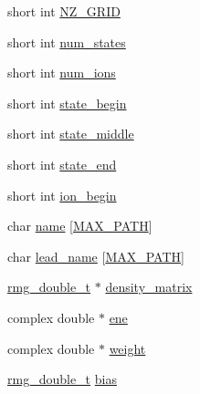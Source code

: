 \begin{DoxyCompactItemize}
\item 
short int \hyperlink{struct_n_o_n___l_i_n_e_a_r___t_h_r_e_e___p_a_r_t_ab39cd3e62908b7bd4a962698452023bd}{N\-Z\-\_\-\-G\-R\-I\-D}
\item 
short int \hyperlink{struct_n_o_n___l_i_n_e_a_r___t_h_r_e_e___p_a_r_t_ab4e8aa04c3f32725fd43c345cae9033b}{num\-\_\-states}
\item 
short int \hyperlink{struct_n_o_n___l_i_n_e_a_r___t_h_r_e_e___p_a_r_t_a90e5e3c0a22e9732f47346ca73d660ba}{num\-\_\-ions}
\item 
short int \hyperlink{struct_n_o_n___l_i_n_e_a_r___t_h_r_e_e___p_a_r_t_a6937a1fa2ad0ad9f66f9365e8825abb1}{state\-\_\-begin}
\item 
short int \hyperlink{struct_n_o_n___l_i_n_e_a_r___t_h_r_e_e___p_a_r_t_af1371e0d06b46f7180e7251fda0e8f25}{state\-\_\-middle}
\item 
short int \hyperlink{struct_n_o_n___l_i_n_e_a_r___t_h_r_e_e___p_a_r_t_aa173900ce7f6aa241d077c97d172a5d9}{state\-\_\-end}
\item 
short int \hyperlink{struct_n_o_n___l_i_n_e_a_r___t_h_r_e_e___p_a_r_t_a9ec3ec36805e886e3b7a410d94c72f0c}{ion\-\_\-begin}
\item 
char \hyperlink{struct_n_o_n___l_i_n_e_a_r___t_h_r_e_e___p_a_r_t_a6f60fba2e13c3a990798849ca4144013}{name} \mbox{[}\hyperlink{_t_d_d_f_t_2_headers_2params_8h_ab99ded389af74001a6298fc9e44e74e5}{M\-A\-X\-\_\-\-P\-A\-T\-H}\mbox{]}
\item 
char \hyperlink{struct_n_o_n___l_i_n_e_a_r___t_h_r_e_e___p_a_r_t_ae14b2607b564fd16153dc407a10ee6f9}{lead\-\_\-name} \mbox{[}\hyperlink{_t_d_d_f_t_2_headers_2params_8h_ab99ded389af74001a6298fc9e44e74e5}{M\-A\-X\-\_\-\-P\-A\-T\-H}\mbox{]}
\item 
\hyperlink{rmgtypes_8h_aaa16921c14f121c56eaa42390a340db8}{rmg\-\_\-double\-\_\-t} $\ast$ \hyperlink{struct_n_o_n___l_i_n_e_a_r___t_h_r_e_e___p_a_r_t_a48d1f3d405c0274049651991265fb3e0}{density\-\_\-matrix}
\item 
complex double $\ast$ \hyperlink{struct_n_o_n___l_i_n_e_a_r___t_h_r_e_e___p_a_r_t_a591c723434f8f6bfa2a1eb2e677dfd6f}{ene}
\item 
complex double $\ast$ \hyperlink{struct_n_o_n___l_i_n_e_a_r___t_h_r_e_e___p_a_r_t_af003a956598e1ec4606ca85aceed6c91}{weight}
\item 
\hyperlink{rmgtypes_8h_aaa16921c14f121c56eaa42390a340db8}{rmg\-\_\-double\-\_\-t} \hyperlink{struct_n_o_n___l_i_n_e_a_r___t_h_r_e_e___p_a_r_t_a3b3036d19384f42cfeff40dcc51cd23d}{bias}
\item 

\end{DoxyCompactItemize}
